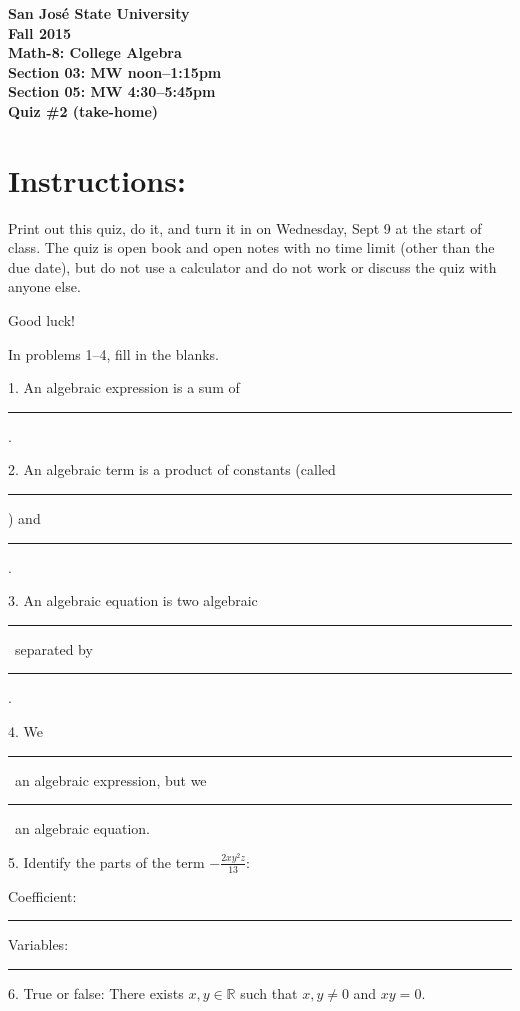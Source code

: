\documentclass[letterpaper, 12pt]{article}
\begin{document}
\begin{center}
\bfseries
San Jos\'{e} State University \\
Fall 2015 \\
Math-8: College Algebra \\
Section 03: MW noon--1:15pm \\
Section 05: MW 4:30--5:45pm \\
\bigskip
Quiz \#2 (take-home)
\end{center}

\section*{Instructions:}

Print out this quiz, do it, and turn it in on Wednesday, Sept 9 at the start of
class. The quiz is open book and open notes with no time limit (other than the
due date), but do not use a calculator and do not work or discuss the quiz with
anyone else.

\bigskip

Good luck!

\bigskip

In problems 1--4, fill in the blanks.

\newcommand{\fillin}{\rule{1in}{1pt}}

\bigskip

1. An algebraic expression is a sum of \fillin.

\bigskip

2. An algebraic term is a product of constants (called \fillin) and \fillin.

\bigskip

3. An algebraic equation is two algebraic \fillin\ separated by \fillin.

\bigskip

4. We \fillin\ an algebraic expression, but we \fillin\ an algebraic equation.

\bigskip

5. Identify the parts of the term $-\frac{2xy^2z}{13}$:

\bigskip

Coefficient: \fillin

\bigskip

Variables: \fillin

\bigskip

6. True or false: There exists $x,y\in\mathbb{R}$ such that $x,y\ne0$ and
$xy=0$.

\vspace{0.5in}
\end{document}
